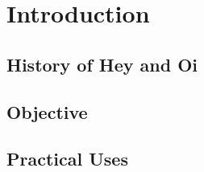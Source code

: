 \chapter{Introduction}

\setcounter{page}{12}

\section{History of Hey and Oi} 



\section{Objective}



\section{Practical Uses}


